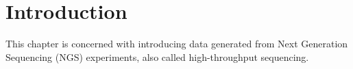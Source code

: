 \section{Introduction} \label{data-intro-sect}
This chapter is concerned with introducing data generated from Next Generation Sequencing (NGS) experiments, also called high-throughput sequencing.


